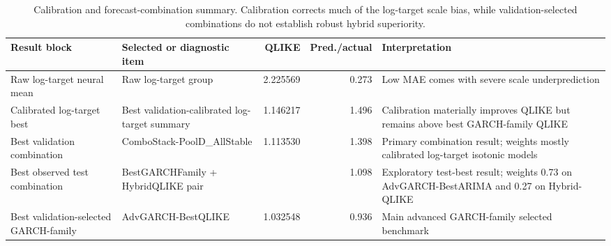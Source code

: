 \begin{table}[!t]
\centering
\caption{Calibration and forecast-combination summary. Calibration corrects much of the log-target scale bias, while validation-selected combinations do not establish robust hybrid superiority.}
\label{tab:calibration-combinations}
\scriptsize
\setlength{\tabcolsep}{4pt}
\begin{tabular}{@{}L{0.22\textwidth}L{0.22\textwidth}r r L{0.32\textwidth}@{}}
\toprule
Result block & Selected or diagnostic item & QLIKE & Pred./actual & Interpretation \\
\midrule
Raw log-target neural mean & Raw log-target group & 2.225569 & 0.273 & Low MAE comes with severe scale underprediction \\
Calibrated log-target best & Best validation-calibrated log-target summary & 1.146217 & 1.496 & Calibration materially improves QLIKE but remains above best GARCH-family QLIKE \\
Best validation combination & ComboStack-PoolD\_AllStable & 1.113530 & 1.398 & Primary combination result; weights mostly calibrated log-target isotonic models \\
Best observed test combination & BestGARCHFamily + HybridQLIKE pair &  & 1.098 & Exploratory test-best result; weights 0.73 on AdvGARCH-BestARIMA and 0.27 on Hybrid-QLIKE \\
Best validation-selected GARCH-family & AdvGARCH-BestQLIKE & 1.032548 & 0.936 & Main advanced GARCH-family selected benchmark \\
\bottomrule
\end{tabular}
\end{table}
